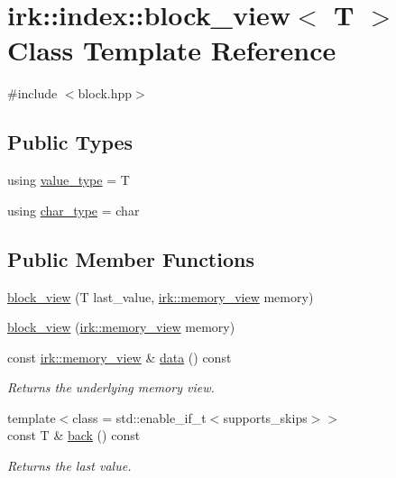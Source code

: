 \hypertarget{classirk_1_1index_1_1block__view}{}\section{irk\+:\+:index\+:\+:block\+\_\+view$<$ T $>$ Class Template Reference}
\label{classirk_1_1index_1_1block__view}


{\ttfamily \#include $<$block.\+hpp$>$}

\subsection*{Public Types}
\begin{DoxyCompactItemize}
\item 
using \mbox{\hyperlink{classirk_1_1index_1_1block__view_ad79674ad64c94861b74dd15e603c0f8b}{value\+\_\+type}} = T
\item 
using \mbox{\hyperlink{classirk_1_1index_1_1block__view_af24362772032fb0ab7364162e0611483}{char\+\_\+type}} = char
\end{DoxyCompactItemize}
\subsection*{Public Member Functions}
\begin{DoxyCompactItemize}
\item 
\mbox{\hyperlink{classirk_1_1index_1_1block__view_ac42c1a26fd05c0f53f91cc51cc090e75}{block\+\_\+view}} (T last\+\_\+value, \mbox{\hyperlink{classirk_1_1memory__view}{irk\+::memory\+\_\+view}} memory)
\item 
\mbox{\hyperlink{classirk_1_1index_1_1block__view_aebe22ab369a7a62a205f2b3e4196cc3d}{block\+\_\+view}} (\mbox{\hyperlink{classirk_1_1memory__view}{irk\+::memory\+\_\+view}} memory)
\item 
const \mbox{\hyperlink{classirk_1_1memory__view}{irk\+::memory\+\_\+view}} \& \mbox{\hyperlink{classirk_1_1index_1_1block__view_a90c3c66aad54b62b4378b4a653fb4260}{data}} () const
\begin{DoxyCompactList}\small\item\em Returns the underlying memory view. \end{DoxyCompactList}\item 
{\footnotesize template$<$class  = std\+::enable\+\_\+if\+\_\+t$<$supports\+\_\+skips$>$$>$ }\\const T \& \mbox{\hyperlink{classirk_1_1index_1_1block__view_a88f00828b2dd384cb925022a3333fdf7}{back}} () const
\begin{DoxyCompactList}\small\item\em Returns the last value. \end{DoxyCompactList}\end{DoxyCompactItemize}


